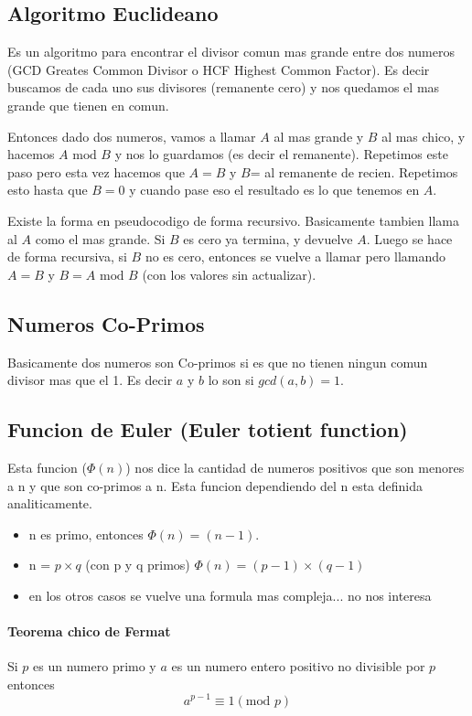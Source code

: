 \documentclass[12pt, oneside]{article}
\begin{document}
\subsection{Algoritmo Euclideano}
Es un algoritmo para encontrar el divisor comun mas grande entre dos numeros
(GCD Greates Common Divisor o HCF Highest Common Factor).
Es decir buscamos de cada uno sus divisores (remanente cero) y nos quedamos
el mas grande que tienen en comun.

Entonces dado dos numeros, vamos a llamar $A$ al mas grande y $B$ al mas chico,
y hacemos $A \text{ mod } B$ y nos lo guardamos (es decir el remanente).
Repetimos este paso pero esta vez hacemos que $A=B$ y $B$= al remanente de recien.
Repetimos esto hasta que $B=0$ y cuando pase eso el resultado es lo que tenemos en $A$.

Existe la forma en pseudocodigo de forma recursivo.
Basicamente tambien llama al $A$ como el mas grande.
Si $B$ es cero ya termina, y devuelve $A$.
Luego se hace de forma recursiva, si $B$ no es cero, entonces se vuelve a llamar
pero llamando $A=B$ y $B=A\text{ mod }B$ (con los valores sin actualizar).

\subsection{Numeros Co-Primos}
Basicamente dos numeros son Co-primos si es que no tienen ningun comun divisor mas que el 1.
Es decir $a$ y $b$ lo son si $gcd(a,b)=1$.

\subsection{Funcion de Euler (Euler totient function)}
Esta funcion ($\Phi(n)$) nos dice la cantidad de numeros positivos que son menores a n y que son
co-primos a n.
Esta funcion dependiendo del n esta definida analiticamente.

\begin{itemize}
    \item n es primo, entonces $\Phi(n)=(n-1)$.
    \item n = $p\times q$ (con p y q primos) $\Phi(n) = (p-1)\times (q-1)$
    \item en los otros casos se vuelve una formula mas compleja... no nos interesa
\end{itemize}

\paragraph{Teorema chico de Fermat}
Si $p$ es un numero primo y $a$ es un numero entero positivo no divisible por $p$ entonces
\begin{equation}
        a^{p-1} \equiv 1 (\text{mod } p)
        \label{eq:fermatLittle}
\end{equation}
\end{document}
